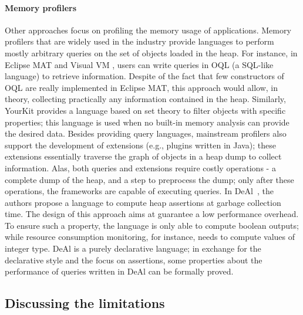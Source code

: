 \paragraph{Memory profilers}
Other approaches focus on profiling the memory usage of applications.
Memory profilers that are widely used in the industry provide languages to perform mostly arbitrary queries on the set of objects loaded in the heap.
For instance, in Eclipse MAT \cite{Biermann:2006:GDI:2087202.2087244} and Visual VM \cite{OQL-visualvm}, users can write queries in OQL (a SQL-like language) to retrieve information.
Despite of the fact that few constructors of OQL are really implemented in Eclipse MAT, this approach would allow, in theory, collecting practically any information contained in the heap.
Similarly, YourKit \cite{yourkit} provides a language based on set theory to filter objects with specific properties; this language is used when no built-in memory analysis can provide the desired data.
Besides providing query languages, mainstream profilers also support the development of extensions (e.g., plugins written in Java); these extensions essentially traverse the graph of objects in a heap dump to collect information.
Alas, both queries and extensions require costly operations - a complete dump of the heap, and a step to preprocess the dump; only after these operations, the frameworks are capable of executing queries.
In DeAl~\cite{Reichenbach:2010:GCE:1869459.1869482}, the authors propose a language to compute heap assertions at garbage collection time.
The design of this approach aims at guarantee a low performance overhead.
To ensure such a property, the language is only able to compute boolean outputs; while resource consumption monitoring, for instance, needs to compute values of integer type.
DeAl is a purely declarative language; in exchange for the declarative style and the focus on assertions, some properties about the performance of queries written in DeAl can be formally proved. 

\subsection{Discussing the limitations} \label{sec:discussing-tools-to-ease-construction}

